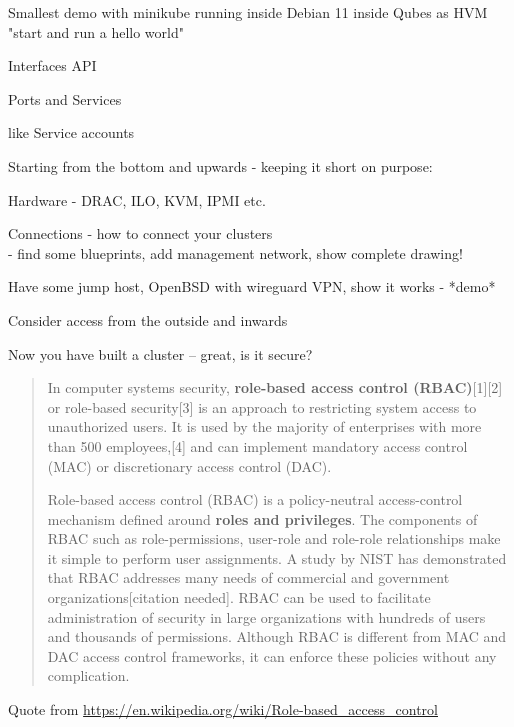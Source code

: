 \documentclass[Screen16to9,17pt]{foils}
\begin{document}

\begin{list2}
\item Smallest demo with minikube running inside Debian 11 inside Qubes as HVM
    "start and run a hello world"
\end{list2}


\begin{list2}
\item Interfaces API
\item Ports and Services
\end{list2}



\begin{list2}
\item like Service accounts
\end{list2}



Starting from the bottom and upwards - keeping it short on purpose:
\begin{list2}
\item Hardware - DRAC, ILO, KVM, IPMI etc.
\item Connections - how to connect your clusters\\
- find some blueprints, add management network, show complete drawing!
\item Have some jump host, OpenBSD with wireguard VPN, show it works - *demo*
\item Consider access from the outside and inwards
\end{list2}

Now you have built a cluster -- great, is it secure?




\begin{quote}
In computer systems security, {\bf role-based access control (RBAC)}[1][2] or role-based security[3] is an approach to restricting system access to unauthorized users. It is used by the majority of enterprises with more than 500 employees,[4] and can implement mandatory access control (MAC) or discretionary access control (DAC).

Role-based access control (RBAC) is a policy-neutral access-control mechanism defined around {\bf roles and privileges}. The components of RBAC such as role-permissions, user-role and role-role relationships make it simple to perform user assignments. A study by NIST has demonstrated that RBAC addresses many needs of commercial and government organizations[citation needed]. RBAC can be used to facilitate administration of security in large organizations with hundreds of users and thousands of permissions. Although RBAC is different from MAC and DAC access control frameworks, it can enforce these policies without any complication.
\end{quote}
Quote from \url{https://en.wikipedia.org/wiki/Role-based_access_control}
\end{document}
